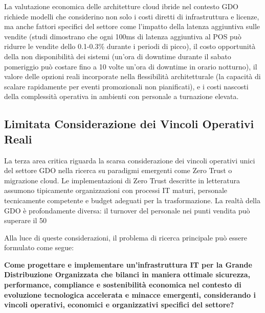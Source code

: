 La valutazione economica delle architetture cloud ibride nel contesto GDO richiede modelli che considerino non solo i costi diretti di infrastruttura e licenze, ma anche fattori specifici del settore come l'impatto della latenza aggiuntiva sulle vendite (studi dimostrano che ogni 100ms di latenza aggiuntiva al POS può ridurre le vendite dello 0.1-0.3\% durante i periodi di picco), il costo opportunità della non disponibilità dei sistemi (un'ora di downtime durante il sabato pomeriggio può costare fino a 10 volte un'ora di downtime in orario notturno), il valore delle opzioni reali incorporate nella flessibilità architetturale (la capacità di scalare rapidamente per eventi promozionali non pianificati), e i costi nascosti della complessità operativa in ambienti con personale a turnazione elevata.

\subsection{Limitata Considerazione dei Vincoli Operativi Reali}

La terza area critica riguarda la scarsa considerazione dei vincoli operativi unici del settore GDO nella ricerca su paradigmi emergenti come Zero Trust o migrazione cloud. Le implementazioni di Zero Trust descritte in letteratura assumono tipicamente organizzazioni con processi IT maturi, personale tecnicamente competente e budget adeguati per la trasformazione. La realtà della GDO è profondamente diversa: il turnover del personale nei punti vendita può superare il 50%

Alla luce di queste considerazioni, il problema di ricerca principale può essere formulato come segue:

\textbf{Come progettare e implementare un'infrastruttura IT per la Grande Distribuzione Organizzata che bilanci in maniera ottimale sicurezza, performance, compliance e sostenibilità economica nel contesto di evoluzione tecnologica accelerata e minacce emergenti, considerando i vincoli operativi, economici e organizzativi specifici del settore?}


